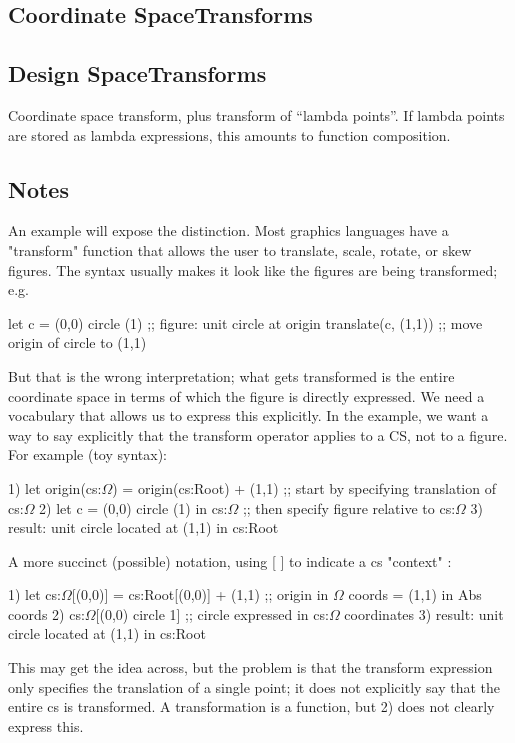 \documentclass[12pt]{tufte-handout}
\numberwithin{equation}{subsection}
\numberwithin{equation}{subsection}
\newcommand\Cspace{Coordinate space}
\newcommand\CSpace{Coordinate Space}
\newcommand\DSpace{Design Space}
\begin{document}
{  %
  \subsection{\CSpace Transforms}

  \subsection{\DSpace Transforms}
  \label{subs:}

  \Cspace{} transform, plus transform of ``lambda points''.  If lambda points are stored as lambda expressions, this amounts to function composition.

  \subsection{Notes}

  An example will expose the distinction.  Most graphics languages have
  a "transform" function that allows the user to translate, scale,
  rotate, or skew figures.  The syntax usually makes it look like the
  figures are being transformed; e.g.

  let c = (0,0) circle (1)  ;; figure: unit circle at origin
  translate(c, (1,1))	      ;; move origin of circle to (1,1)

  But that is the wrong interpretation; what gets transformed is the
  entire coordinate space in terms of which the figure is directly
  expressed.  We need a vocabulary that allows us to express this
  explicitly.  In the example, we want a way to say explicitly that the
  transform operator applies to a CS, not to a figure.  For example (toy syntax):

  1)	  let origin(cs:$\Omega$) = origin(cs:Root) + (1,1)  ;; start by specifying translation of cs:$\Omega$
  2)	  let c = (0,0) circle (1) in cs:$\Omega$  ;; then specify figure relative to cs:$\Omega$
  3)	  result: unit circle located at (1,1) in cs:Root

  A more succinct (possible) notation, using [ ] to indicate a cs "context" :

  1)	  let cs:$\Omega$[(0,0)] = cs:Root[(0,0)] + (1,1)  ;; origin in $\Omega$ coords = (1,1) in Abs coords
  2)	  cs:$\Omega$[(0,0) circle 1]   ;; circle expressed in cs:$\Omega$ coordinates
  3)	  result: unit circle located at (1,1) in cs:Root

  This may get the idea across, but the problem is that the transform
  expression only specifies the translation of a single point; it does
  not explicitly say that the entire cs is transformed.  A
  transformation is a function, but 2) does not clearly express this.

}
\end{document}

